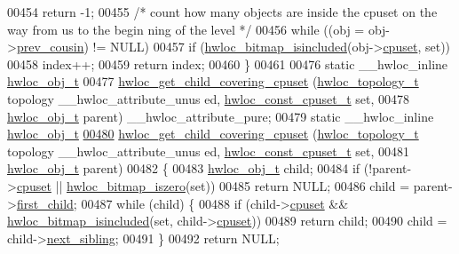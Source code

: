 \begin{DoxyCode}
{{00454     \textcolor{keywordflow}{return} -1;
00455   \textcolor{comment}{/* count how many objects are inside the cpuset on the way from us to the begin
      ning of the level */}
00456   \textcolor{keywordflow}{while} ((obj = obj->\hyperlink{a00016_ac715989f55ff5a0eb6be2969ee477ec0}{prev_cousin}) != NULL)
00457     \textcolor{keywordflow}{if} (\hyperlink{a00065_gaae29e14a926c198e8f91e6e4790621e7}{hwloc_bitmap_isincluded}(obj->\hyperlink{a00016_a67925e0f2c47f50408fbdb9bddd0790f}{cpuset}, \textcolor{keyword}{set}))
00458       index++;
00459   \textcolor{keywordflow}{return} index;
00460 \}
00461 
00476 \textcolor{keyword}{static} \_\_hwloc\_inline \hyperlink{a00016}{hwloc_obj_t}
00477 \hyperlink{a00055_ga69a22cc76c88115aee7b7e6fc53fca7d}{hwloc_get_child_covering_cpuset} (\hyperlink{a00039_ga9d1e76ee15a7dee158b786c30b6a6e38}{hwloc_topology_t} topology \_\_hwloc\_attribute\_unus
      ed, \hyperlink{a00040_ga1f784433e9b606261f62d1134f6a3b25}{hwloc_const_cpuset_t} \textcolor{keyword}{set},
00478                                 \hyperlink{a00016}{hwloc_obj_t} parent) \_\_hwloc\_attribute\_pure;
00479 \textcolor{keyword}{static} \_\_hwloc\_inline \hyperlink{a00016}{hwloc_obj_t}
\hypertarget{a00031_source_l00480}{}\hyperlink{a00055_ga69a22cc76c88115aee7b7e6fc53fca7d}{00480} \hyperlink{a00055_ga69a22cc76c88115aee7b7e6fc53fca7d}{hwloc_get_child_covering_cpuset} (\hyperlink{a00039_ga9d1e76ee15a7dee158b786c30b6a6e38}{hwloc_topology_t} topology \_\_hwloc\_attribute\_unus
      ed, \hyperlink{a00040_ga1f784433e9b606261f62d1134f6a3b25}{hwloc_const_cpuset_t} \textcolor{keyword}{set},
00481                                 \hyperlink{a00016}{hwloc_obj_t} parent)
00482 \{
00483   \hyperlink{a00016}{hwloc_obj_t} child;
00484   \textcolor{keywordflow}{if} (!parent->\hyperlink{a00016_a67925e0f2c47f50408fbdb9bddd0790f}{cpuset} || \hyperlink{a00065_gaa94fed35d2a598bc4a8657b6955b7bf5}{hwloc_bitmap_iszero}(\textcolor{keyword}{set}))
00485     \textcolor{keywordflow}{return} NULL;
00486   child = parent->\hyperlink{a00016_af51d08a0a79dba517c06c5afedc8d2dc}{first_child};
00487   \textcolor{keywordflow}{while} (child) \{
00488     \textcolor{keywordflow}{if} (child->\hyperlink{a00016_a67925e0f2c47f50408fbdb9bddd0790f}{cpuset} && \hyperlink{a00065_gaae29e14a926c198e8f91e6e4790621e7}{hwloc_bitmap_isincluded}(\textcolor{keyword}{set}, child->\hyperlink{a00016_a67925e0f2c47f50408fbdb9bddd0790f}{cpuset}))
00489       \textcolor{keywordflow}{return} child;
00490     child = child->\hyperlink{a00016_a7f2343ed476fe4942e6fffd4cade1b40}{next_sibling};
00491   \}
00492   \textcolor{keywordflow}{return} NULL;
}}
\end{DoxyCode}
